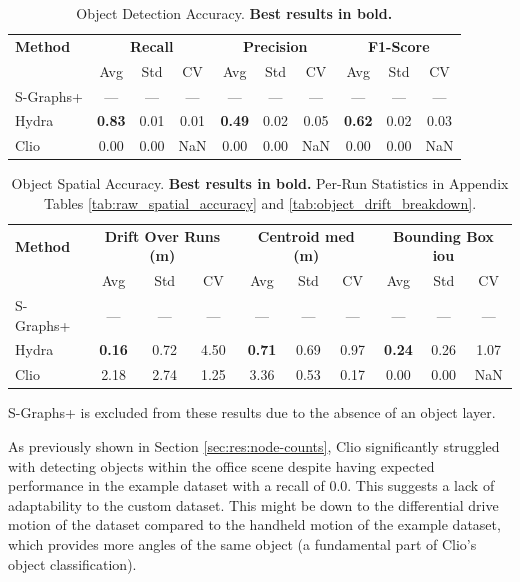 \begin{table}[H]
\centering
\caption{Object Detection Accuracy. \textbf{Best results in bold.}}
\label{tab:object_classification}
\begin{tabular}{l | ccc | ccc | ccc}
\toprule
\textbf{Method} & \multicolumn{3}{c|}{\textbf{Recall}} & \multicolumn{3}{c|}{\textbf{Precision}} & \multicolumn{3}{c}{\textbf{F1-Score}} \\
 & Avg & Std & CV & Avg & Std & CV & Avg & Std & CV \\
\midrule
S-Graphs+ & --- & --- & --- & --- & --- & --- & --- & --- & --- \\
Hydra     & \textbf{0.83} & 0.01 & 0.01 & \textbf{0.49} & 0.02 & 0.05 & \textbf{0.62} & 0.02 & 0.03 \\
Clio      & 0.00 & 0.00 & NaN  & 0.00 & 0.00 & NaN  & 0.00 & 0.00 & NaN  \\
\bottomrule
\end{tabular}
\end{table}

\begin{table}[H]
\centering
\caption{Object Spatial Accuracy. \textbf{Best results in bold.} Per-Run Statistics in Appendix Tables \ref{tab:raw_spatial_accuracy} and \ref{tab:object_drift_breakdown}.}
\label{tab:object_spatial_revised}
\begin{tabular}{l | ccc | ccc | ccc}
\toprule
\textbf{Method} & \multicolumn{3}{c|}{\textbf{Drift Over Runs (m)}} & \multicolumn{3}{c|}{\textbf{Centroid \gls{med} (m)}} & \multicolumn{3}{c}{\textbf{Bounding Box \gls{iou}}} \\
 & Avg & Std & CV & Avg & Std & CV & Avg & Std & CV \\
\midrule
S-Graphs+ & --- & --- & --- & --- & --- & --- & --- & --- & --- \\
Hydra     & \textbf{0.16} & 0.72 & 4.50 & \textbf{0.71} & 0.69 & 0.97 & \textbf{0.24} & 0.26 & 1.07 \\
Clio      & 2.18 & 2.74 & 1.25 & 3.36 & 0.53 & 0.17 & 0.00 & 0.00 & NaN \\
\bottomrule
\end{tabular}
\end{table}

S-Graphs+ is excluded from these results due to the absence of an object layer.

As previously shown in Section \ref{sec:res:node-counts}, Clio significantly struggled with detecting objects within the office scene despite having expected performance in the example dataset with a recall of 0.0. This suggests a lack of adaptability to the custom dataset. This might be down to the differential drive motion of the dataset compared to the handheld motion of the example dataset, which provides more angles of the same object (a fundamental part of Clio’s object classification).

